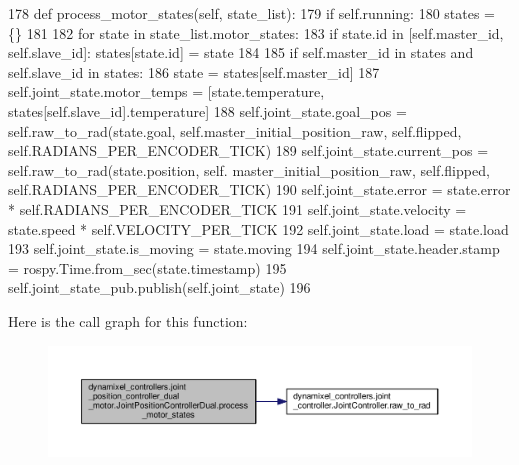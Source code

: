 \begin{DoxyCode}
178     \textcolor{keyword}{def }process\_motor\_states(self, state\_list):
179         \textcolor{keywordflow}{if} self.running:
180             states = \{\}
181             
182             \textcolor{keywordflow}{for} state \textcolor{keywordflow}{in} state\_list.motor\_states:
183                 \textcolor{keywordflow}{if} state.id \textcolor{keywordflow}{in} [self.master\_id, self.slave\_id]: states[state.id] = state
184                                
185             \textcolor{keywordflow}{if} self.master\_id \textcolor{keywordflow}{in} states \textcolor{keywordflow}{and} self.slave\_id \textcolor{keywordflow}{in} states:
186                 state = states[self.master\_id]
187                 self.joint\_state.motor\_temps = [state.temperature, states[self.slave\_id].temperature]
188                 self.joint\_state.goal\_pos = self.raw\_to\_rad(state.goal, self.master\_initial\_position\_raw, 
      self.flipped, self.RADIANS\_PER\_ENCODER\_TICK)
189                 self.joint\_state.current\_pos = self.raw\_to\_rad(state.position, self.
      master\_initial\_position\_raw, self.flipped, self.RADIANS\_PER\_ENCODER\_TICK)
190                 self.joint\_state.error = state.error * self.RADIANS\_PER\_ENCODER\_TICK
191                 self.joint\_state.velocity = state.speed * self.VELOCITY\_PER\_TICK
192                 self.joint\_state.load = state.load
193                 self.joint\_state.is\_moving = state.moving
194                 self.joint\_state.header.stamp = rospy.Time.from\_sec(state.timestamp)
195                 self.joint\_state\_pub.publish(self.joint\_state)
196 
\end{DoxyCode}
Here is the call graph for this function\+:
\nopagebreak
\begin{figure}[H]
\begin{center}
\leavevmode
\includegraphics[width=350pt]{d7/d04/classdynamixel__controllers_1_1joint__position__controller__dual__motor_1_1_joint_position_controller_dual_a698acc04b07a10f5d79e694d632daa46_cgraph}
\end{center}
\end{figure}
\mbox{\label{classdynamixel__controllers_1_1joint__controller_1_1_joint_controller_aed0bae387958b56f88fd707e9da9e8f1}} 
